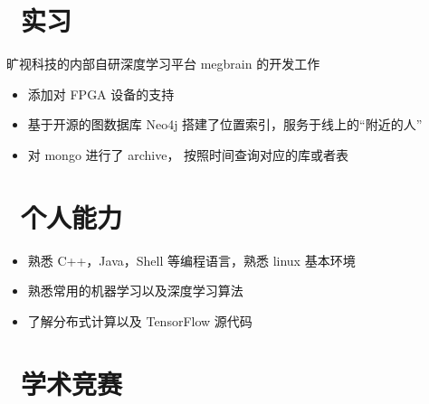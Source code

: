 \documentclass{resume}
\begin{document}
\section{\faUsers\ 实习}
旷视科技的内部自研深度学习平台 megbrain 的开发工作
\begin{itemize}
  \item 添加对 FPGA 设备的支持
\end{itemize}

\begin{itemize}
  \item 基于开源的图数据库 Neo4j 搭建了位置索引，服务于线上的“附近的人”
  \item 对 mongo 进行了 archive， 按照时间查询对应的库或者表
\end{itemize}


\section{\faCogs\ 个人能力}
\begin{itemize}[parsep=0.5ex]
  \item 熟悉 C++，Java，Shell 等编程语言，熟悉 linux 基本环境
  \item 熟悉常用的机器学习以及深度学习算法
  \item 了解分布式计算以及 TensorFlow 源代码
\end{itemize}

\section{\faTrophy\ 学术竞赛}
%
%
\end{document}
